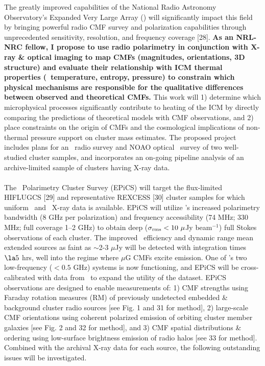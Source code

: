 \documentclass[12pt]{article}
\begin{document}
The greatly improved capabilities of the National Radio Astronomy
Observatory's Expanded Very Large Array (\evla) will significantly
impact this field by bringing powerful radio CMF survey and
polarization capabilities through unprecedented sensitivity,
resolution, and frequency coverage [28]. {\bf{As an NRL-NRC fellow, I
    propose to use radio polarimetry in conjunction with X-ray \&
    optical imaging to map CMFs (magnitudes, orientations, 3D
    structure) and evaluate their relationship with ICM thermal
    properties (\eg\ temperature, entropy, pressure) to constrain
    which physical mechanisms are responsible for the qualitative
    differences between observed and theoretical CMFs.}}  This work
will 1) determine which microphysical processes significantly
contribute to heating of the ICM by directly comparing the predictions
of theoretical models with CMF observations, and 2) place constraints
on the origin of CMFs and the cosmological implications of non-thermal
pressure support on cluster mass estimates. The proposed project
includes plans for an \evla\ radio survey and NOAO optical
\halpha\ survey of two well-studied cluster samples, and incorporates
an on-going pipeline analysis of an archive-limited sample of clusters
having X-ray data.\\

\\
\indent The \evla\ Polarimetry Cluster Survey (EPiCS) will target the
flux-limited HIFLUGCS [29] and representative REXCESS [30] cluster
samples for which uniform \chandra\ and \xmm\ X-ray data is
available. EPiCS will utilize \evla's increased polarimetry bandwidth
(8 GHz per polarization) and frequency accessibility (74 MHz; 330 MHz;
full coverage 1--2 GHz) to obtain deep ($\sigma_{\rm{rms}} < 10
~\mu$Jy beam$^{-1}$) full Stokes observations of each cluster. The
improved \evla\ efficiency and dynamic range mean extended sources as
faint as $\sim$2-3 $\mu$Jy will be detected with integration times
$\la 5$ hrs, well into the regime where $\mu$G CMFs excite
emission. One of \evla's two low-frequency ($< 0.5$ GHz) systems is
now functioning, and EPiCS will be cross-calibrated with data from
\lofar\ to expand the utility of the dataset. EPiCS observations are
designed to enable measurements of: 1) CMF strengths using Faraday
rotation measures (RM) of previously undetected embedded \& background
cluster radio sources [see Fig. 1 and 31 for method], 2) large-scale
CMF orientations using coherent polarized emission of orbiting cluster
member galaxies [see Fig. 2 and 32 for method], and 3) CMF spatial
distributions \& ordering using low-surface brightness emission of
radio halos [see 33 for method]. Combined with the archival X-ray data
for each source, the following outstanding issues will be
investigated.
\end{document}
